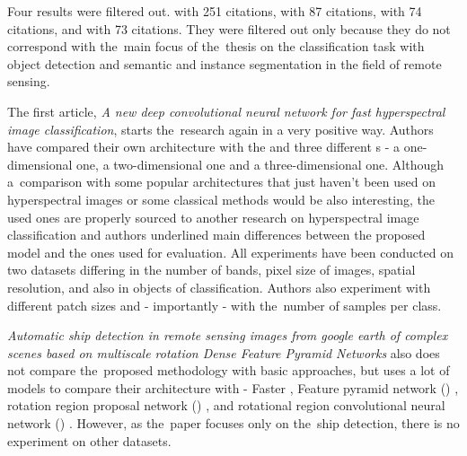 Four results were filtered out. \cite{dl-for-cv} with 251 citations, \cite{dl-lungs} with 87 citations, \cite{maoxian-landslide} with 74 citations, and \cite{state-of-the-art-dl} with 73 citations. They were filtered out only because they do not correspond with the~main focus of the~thesis on the classification task with object detection and semantic and instance segmentation in the field of remote sensing. 

The first article, \textit{A new deep convolutional neural network for fast hyperspectral image classification}, starts the~research again in a very positive way. Authors have compared their own architecture with the  and three different s - a one-dimensional one, a two-dimensional one and a three-dimensional one. Although a~comparison with some popular architectures that just haven't been used on hyperspectral images or some classical  methods would be also interesting, the used ones are properly sourced to another research on hyperspectral image classification and authors underlined main differences between the proposed model and the ones used for evaluation. All experiments have been conducted on two datasets differing in the number of bands, pixel size of images, spatial resolution, and also in objects of classification. Authors also experiment with different patch sizes and - importantly - with the~number of samples per class.

\textit{Automatic ship detection in remote sensing images from google earth of complex scenes based on multiscale rotation Dense Feature Pyramid Networks} also does not compare the~proposed methodology with basic  approaches, but uses a lot of  models to compare their architecture with - Faster , Feature pyramid network () \cite{fpn}, rotation region proposal network () \cite{rrpn}, and rotational region convolutional neural network () \cite{r2cnn}. However, as the~paper focuses only on the~ship detection, there is no experiment on other datasets.

